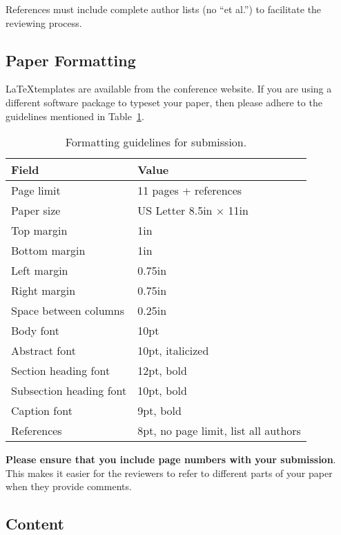 \documentclass[pageno]{jpaper}
\begin{document}
References must include complete author lists (no ``et al.'') to
facilitate the reviewing process.

\subsection{Paper Formatting} 

\LaTeX templates \cite{lamport94,goossens93} are available from the
conference website. If you are using a different software package to
typeset your paper, then please adhere to the guidelines mentioned in
Table~\ref{table:formatting}.

\begin{table}[h!]
  \centering
  \begin{tabular}{|l|l|}
    \hline
    \textbf{Field} & \textbf{Value}\\
    \hline
    \hline
    Page limit & 11 pages + references\\
    \hline
    Paper size & US Letter 8.5in $\times$ 11in\\
    \hline
    Top margin & 1in\\
    \hline
    Bottom margin & 1in\\
    \hline
    Left margin & 0.75in\\
    \hline
    Right margin & 0.75in\\
    \hline
    Space between columns & 0.25in\\
    \hline
    Body font & 10pt\\
    \hline
    Abstract font & 10pt, italicized\\
    \hline
    Section heading font & 12pt, bold\\
    \hline
    Subsection heading font & 10pt, bold\\
    \hline
    Caption font & 9pt, bold\\
    \hline
    References & 8pt, no page limit, list all authors\\
    \hline
  \end{tabular}
  \caption{Formatting guidelines for submission.}
  \label{table:formatting}
\end{table}

\textbf{Please ensure that you include page numbers with your
submission}. This makes it easier for the reviewers to refer to
different parts of your paper when they provide comments.

\subsection{Content}
\end{document}
